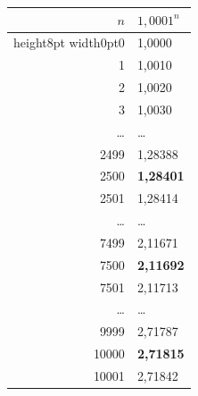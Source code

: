 \begin{center}
\begin{tabular}{@{}r|l@{}}
$n$ & $1{,}0001^n$ \\
\hline
\vrule height8pt width0pt0  &  1,0000 \\
1  &  1,0010 \\
2  &  1,0020 \\
3  &  1,0030 \\
\ldots & \ldots \\
2499  &  1,28388 \\
2500  &  \textbf{1,28401} \\
2501  &  1,28414 \\
\ldots & \ldots \\
7499  &  2,11671 \\
7500  &  \textbf{2,11692} \\
7501  &  2,11713 \\
\ldots & \ldots \\
9999   &  2,71787 \\
10000  &  \textbf{2,71815} \\
10001  &  2,71842 
\end{tabular}
\end{center}